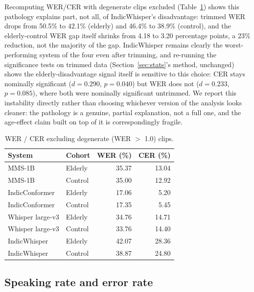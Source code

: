 \documentclass[11pt]{article}
\begin{document}
Recomputing WER/CER with degenerate clips excluded (Table~\ref{tab:trimmed}) shows this pathology
explains part, not all, of IndicWhisper's disadvantage: trimmed WER drops from 50.5\% to 42.1\%
(elderly) and 46.4\% to 38.9\% (control), and the elderly-control WER gap itself shrinks from 4.18
to 3.20 percentage points, a 23\% reduction, not the majority of the gap. IndicWhisper remains
clearly the worst-performing system of the four even after trimming, and re-running the
significance tests on trimmed data (Section~\ref{sec:stats}'s method, unchanged) shows the
elderly-disadvantage signal itself is sensitive to this choice: CER stays nominally significant
($d=0.290$, $p=0.040$) but WER does not ($d=0.233$, $p=0.085$), where both were nominally
significant untrimmed. We report this instability directly rather than choosing whichever version
of the analysis looks cleaner: the pathology is a genuine, partial explanation, not a full one, and
the age-effect claim built on top of it is correspondingly fragile.

\begin{table}[H]
\centering
\caption{WER / CER excluding degenerate (WER $>$ 1.0) clips.}
\label{tab:trimmed}
\small
\begin{tabular}{llrr}
\toprule
\textbf{System} & \textbf{Cohort} & \textbf{WER (\%)} & \textbf{CER (\%)} \\
\midrule
MMS-1B & Elderly & 35.37 & 13.04 \\
MMS-1B & Control & 35.00 & 12.92 \\
IndicConformer & Elderly & 17.06 & 5.20 \\
IndicConformer & Control & 17.35 & 5.45 \\
Whisper large-v3 & Elderly & 34.76 & 14.71 \\
Whisper large-v3 & Control & 33.76 & 14.40 \\
IndicWhisper & Elderly & 42.07 & 28.36 \\
IndicWhisper & Control & 38.87 & 24.80 \\
\bottomrule
\end{tabular}
\end{table}

\subsection{Speaking rate and error rate}
\label{sec:speakingrate}
\end{document}
